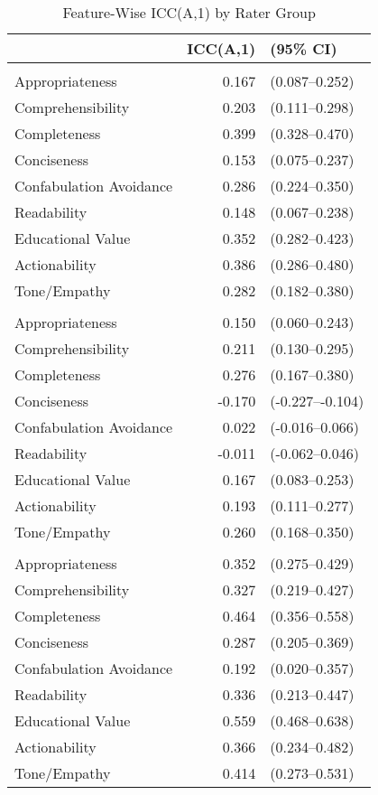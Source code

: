 \documentclass[
  11pt]{report}
\begin{document}
\begin{table}
\caption*{
{\large Feature-Wise ICC(A,1) by Rater Group}
} 
\fontsize{12.0pt}{14.4pt}\selectfont
\begin{tabular*}{\linewidth}{@{\extracolsep{\fill}}l|rl}
\toprule
 & ICC(A,1) & (95\% CI) \\ 
\midrule\addlinespace[2.5pt]
\multicolumn{3}{l}{Auto-grader} \\[2.5pt] 
\midrule\addlinespace[2.5pt]
Appropriateness & 0.167 & (0.087–0.252) \\ 
Comprehensibility & 0.203 & (0.111–0.298) \\ 
Completeness & 0.399 & (0.328–0.470) \\ 
Conciseness & 0.153 & (0.075–0.237) \\ 
Confabulation Avoidance & 0.286 & (0.224–0.350) \\ 
Readability & 0.148 & (0.067–0.238) \\ 
Educational Value & 0.352 & (0.282–0.423) \\ 
Actionability & 0.386 & (0.286–0.480) \\ 
Tone/Empathy & 0.282 & (0.182–0.380) \\ 
\midrule\addlinespace[2.5pt]
\multicolumn{3}{l}{Expert} \\[2.5pt] 
\midrule\addlinespace[2.5pt]
Appropriateness & 0.150 & (0.060–0.243) \\ 
Comprehensibility & 0.211 & (0.130–0.295) \\ 
Completeness & 0.276 & (0.167–0.380) \\ 
Conciseness & -0.170 & (-0.227–-0.104) \\ 
Confabulation Avoidance & 0.022 & (-0.016–0.066) \\ 
Readability & -0.011 & (-0.062–0.046) \\ 
Educational Value & 0.167 & (0.083–0.253) \\ 
Actionability & 0.193 & (0.111–0.277) \\ 
Tone/Empathy & 0.260 & (0.168–0.350) \\ 
\midrule\addlinespace[2.5pt]
\multicolumn{3}{l}{Student} \\[2.5pt] 
\midrule\addlinespace[2.5pt]
Appropriateness & 0.352 & (0.275–0.429) \\ 
Comprehensibility & 0.327 & (0.219–0.427) \\ 
Completeness & 0.464 & (0.356–0.558) \\ 
Conciseness & 0.287 & (0.205–0.369) \\ 
Confabulation Avoidance & 0.192 & (0.020–0.357) \\ 
Readability & 0.336 & (0.213–0.447) \\ 
Educational Value & 0.559 & (0.468–0.638) \\ 
Actionability & 0.366 & (0.234–0.482) \\ 
Tone/Empathy & 0.414 & (0.273–0.531) \\ 
\bottomrule
\end{tabular*}
\end{table}
\end{document}
